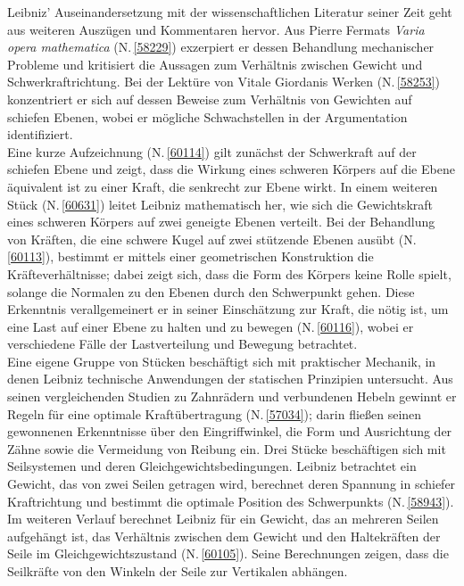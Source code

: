 Leibniz' Auseinandersetzung mit der wissenschaftlichen Literatur seiner Zeit geht aus weiteren Auszügen und Kommentaren hervor. Aus Pierre Fermats \textit{Varia opera mathematica} (N.\,\ref{58229}) exzerpiert er dessen Behandlung mechanischer Probleme und kritisiert die Aussagen zum Verhältnis zwischen Gewicht und Schwerkraftrichtung. Bei der Lektüre von Vitale Giordanis Werken (N.\,\ref{58253}) konzentriert er sich auf dessen Beweise zum Verhältnis von Gewichten auf schiefen Ebenen, wobei er mögliche Schwachstellen in der Argumentation identifiziert.%
\\ \indent
Eine kurze Aufzeichnung (N.\,\ref{60114}) gilt zunächst der Schwerkraft auf der schiefen Ebene und zeigt, dass die Wirkung eines schweren Körpers auf die Ebene äquivalent ist zu einer Kraft, die senkrecht zur Ebene wirkt. In einem weiteren Stück (N.\,\ref{60631}) leitet Leibniz mathematisch her, wie sich die Gewichtskraft eines schweren Körpers auf zwei geneigte Ebenen verteilt. Bei der Behandlung von Kräften, die eine schwere Kugel auf zwei stützende Ebenen ausübt (N.\,\ref{60113}), bestimmt er mittels einer geometrischen Konstruktion die Kräfteverhältnisse; dabei zeigt sich, dass die Form des Körpers keine Rolle spielt, solange die Normalen zu den Ebenen durch den Schwerpunkt gehen. Diese Erkenntnis verallgemeinert er in seiner Einschätzung zur Kraft, die nötig ist, um eine Last auf einer Ebene zu halten und zu bewegen (N.\,\ref{60116}), wobei er verschiedene Fälle der Lastverteilung und Bewegung betrachtet.%
\\ \indent
Eine eigene Gruppe von Stücken beschäftigt sich mit praktischer Mechanik, in denen Leibniz technische Anwendungen der statischen Prinzipien untersucht. Aus seinen vergleichenden Studien zu Zahnrädern und verbundenen Hebeln gewinnt er Regeln für eine optimale Kraftübertragung (N.\,\ref{57034}); darin fließen seinen gewonnenen Erkenntnisse über den Eingriffwinkel, die Form und Ausrichtung der Zähne sowie die Vermeidung von Reibung ein. %
Drei Stücke beschäftigen sich mit Seilsystemen und deren Gleichgewichtsbedingungen. Leibniz betrachtet ein Gewicht, das von zwei Seilen getragen wird, berechnet deren Spannung in schiefer Kraftrichtung und bestimmt die optimale Position des Schwerpunkts  (N.\,\ref{58943}). Im weiteren Verlauf berechnet Leibniz für ein Gewicht, das an mehreren Seilen aufgehängt ist, das Verhältnis zwischen dem Gewicht und den Haltekräften der Seile im Gleichgewichtszustand  (N.\,\ref{60105}). Seine Berechnungen zeigen, dass die Seilkräfte von den Winkeln der Seile zur Vertikalen abhängen.%
